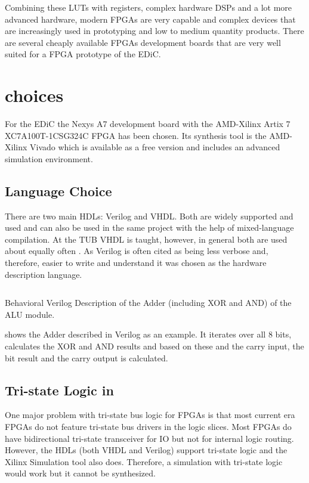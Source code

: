 Combining these \glspl{LUT} with registers, complex hardware \glspl{DSP} and a lot more advanced hardware, modern \glspl{FPGA} are very capable and complex devices that are increasingly used in prototyping and low to medium quantity products.
There are several cheaply available \glspl{FPGA} development boards that are very well suited for a \gls{FPGA} prototype of the \gls{EDiC}.

\section{ choices}
For the \gls{EDiC} the Nexys A7 development board \cite{nexysA7} with the AMD-Xilinx Artix 7 XC7A100T-1CSG324C \gls{FPGA} has been chosen.
Its synthesis tool is the AMD-Xilinx Vivado \cite{vivado} which is available as a free version and includes an advanced simulation environment.

\subsection{Language Choice}
There are two main \glspl{HDL}: Verilog and \gls{VHDL}.
Both are widely supported and used and can also be used in the same project with the help of mixed-language compilation.
At the \gls{TUB} \gls{VHDL} is taught, however, in general both are used about equally often \cite{vhdlVerilog}.
As Verilog is often cited as being less verbose and, therefore, easier to write and understand it was chosen as the hardware description language.

\begin{listing}
  \inputminted[linenos,
    breaklines,
    firstline=65,
    lastline=71,
    frame=leftline,
    xleftmargin=20pt,
  ]{verilog}{src/alu.v}
  \caption{Behavioral Verilog Description of the Adder (including XOR and AND) of the \gls{ALU} module.}
  \label{lst:alu}
\end{listing}
 shows the Adder described in Verilog as an example.
It iterates over all 8 bits, calculates the XOR and AND results and based on these and the carry input, the bit result and the carry output is calculated.

\subsection{Tri-state Logic in }
One major problem with tri-state bus logic for \glspl{FPGA} is that most current era \glspl{FPGA} do not feature tri-state bus drivers in the logic slices.
Most \glspl{FPGA} do have bidirectional tri-state transceiver for \gls{IO} but not for internal logic routing.
However, the \glspl{HDL} (both \gls{VHDL} and Verilog) support tri-state logic and the Xilinx Simulation tool also does.
Therefore, a simulation with tri-state logic would work but it cannot be synthesized.

